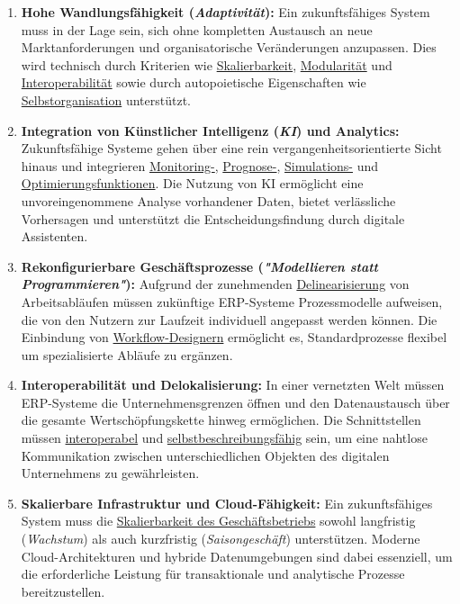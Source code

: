 \begin{enumerate}[label=\arabic*.), leftmargin=*]
    \item \textbf{Hohe Wandlungsfähigkeit (\textit{Adaptivität}):} Ein zukunftsfähiges System muss in der Lage sein, sich ohne kompletten Austausch an neue Marktanforderungen und organisatorische Veränderungen anzupassen. \cite{5}\cite{6} Dies wird technisch durch Kriterien wie \uline{Skalierbarkeit}, \uline{Modularität} und \uline{Interoperabilität} sowie durch autopoietische Eigenschaften wie \uline{Selbstorganisation} unterstützt. \cite{7}\cite{8}\cite{9}\cite{10}
    \item \textbf{Integration von Künstlicher Intelligenz (\textit{\acs{KI}}) und Analytics:} Zukunftsfähige Systeme gehen über eine rein vergangenheitsorientierte Sicht hinaus und integrieren \uline{Monitoring-}, \uline{Prognose-}, \uline{Simulations-} und \uline{Optimierungsfunktionen}. \cite{11}\cite{12} Die Nutzung von \acs{KI} ermöglicht eine unvoreingenommene Analyse vorhandener Daten, bietet verlässliche Vorhersagen und unterstützt die Entscheidungsfindung durch digitale Assistenten. \cite{12}\cite{13}\cite{14}
    \item \textbf{Rekonfigurierbare Geschäftsprozesse (\textit{"Modellieren statt Programmieren"}):} Aufgrund der zunehmenden \uline{Delinearisierung} von Arbeitsabläufen müssen zukünftige \acs{ERP}-Systeme Prozessmodelle aufweisen, die von den Nutzern zur Laufzeit individuell angepasst werden können. \cite{15}\cite{16} Die Einbindung von \uline{Workflow-Designern} ermöglicht es, Standardprozesse flexibel um spezialisierte Abläufe zu ergänzen. \cite{16}
    \item \textbf{Interoperabilität und Delokalisierung:} In einer vernetzten Welt müssen \acs{ERP}-Systeme die Unternehmensgrenzen öffnen und den Datenaustausch über die gesamte Wertschöpfungskette hinweg ermöglichen. \cite{11}\cite{17} Die Schnittstellen müssen \uline{interoperabel} und \uline{selbstbeschreibungsfähig} sein, um eine nahtlose Kommunikation zwischen unterschiedlichen Objekten des digitalen Unternehmens zu gewährleisten. \cite{11}\cite{18}
    \item \textbf{Skalierbare Infrastruktur und Cloud-Fähigkeit:} Ein zukunftsfähiges System muss die \uline{Skalierbarkeit des Geschäftsbetriebs} sowohl langfristig (\textit{Wachstum}) als auch kurzfristig (\textit{Saisongeschäft}) unterstützen. \cite{19} Moderne Cloud-Architekturen und hybride Datenumgebungen sind dabei essenziell, um die erforderliche Leistung für transaktionale und analytische Prozesse bereitzustellen. \cite{20}\cite{21}
\end{enumerate}
